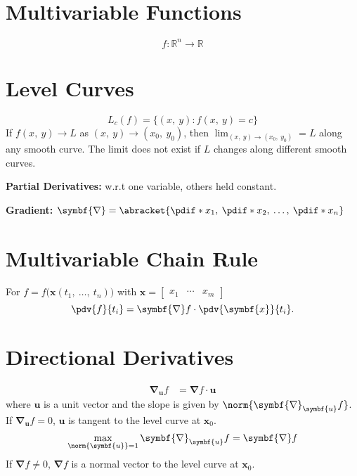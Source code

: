 \documentclass{article}
\begin{document}
\begin{multicols}{3}
    \section*{Multivariable Functions}
    \begin{equation*}
        f:\mathbb{R}^n\to\mathbb{R}
    \end{equation*}
    \section*{Level Curves}
    \begin{equation*}
        L_c\left( f \right) = \bigl\{ \left( x,\: y \right) : f\left(x,\: y\right) = c\bigr\}
    \end{equation*}
    If \(f\left( x,\: y \right) \to L\) as \(\left( x,\: y \right) \to \left( x_0,\: y_0 \right)\), then
    \(\displaystyle \lim_{\left( x,\: y \right) \to \left( x_0,\: y_0 \right)} = L\) along any smooth
    curve. The limit does not exist if \(L\) changes along different smooth curves.

    \textbf{Partial Derivatives:} w.r.t one variable, others held constant.

    \textbf{Gradient:} \(\symbf{\nabla} = \abracket{\pdif*{x_1},\: \pdif*{x_2},\: \dots,\: \pdif*{x_n}}\)
    \section*{Multivariable Chain Rule}
    For \(f=f\bigl(\symbf{x}\left( t_1,\: \ldots,\: t_n \right)\bigr)\) with
    \(\symbf{x}=
    \begin{bmatrix}
        x_1 & \cdots & x_m
    \end{bmatrix}
    \)
    \begin{equation*}
        \pdv{f}{t_i} = \symbf{\nabla}f \cdot \pdv{\symbf{x}}{t_i}.
    \end{equation*}
    \section*{Directional Derivatives}
    \begin{align*}
        \symbf{\nabla}_{\symbf{u}}f
         & = \symbf{\nabla}f \cdot \symbf{u}
    \end{align*}
    where \(\symbf{u}\) is a unit vector and the slope is given by \(\norm{\symbf{\nabla}_{\symbf{u}}f}\).
    If \(\symbf{\nabla}_{\symbf{u}}f=0\), \(\symbf{u}\) is tangent to the level curve at \(\symbf{x}_0\).
    \begin{align*}
        \max_{\norm{\symbf{u}} = 1} \symbf{\nabla}_{\symbf{u}}f = \symbf{\nabla}f
    \end{align*}
    If \(\symbf{\nabla}f\neq 0\), \(\symbf{\nabla}f\) is a normal vector to the level curve at \(\symbf{x}_0\).

\end{multicols}
\end{document}
